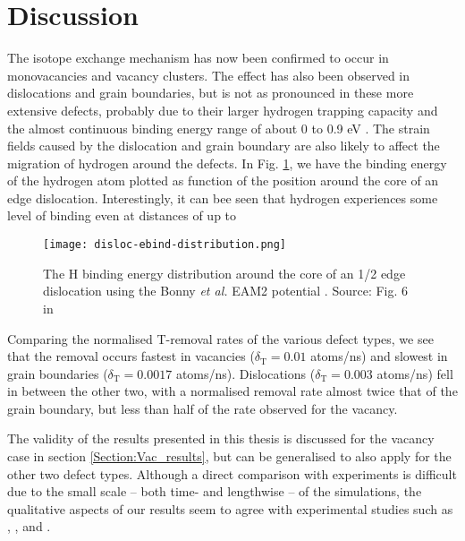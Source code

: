 \section{Discussion}
The isotope exchange mechanism has now been confirmed to occur in monovacancies and vacancy clusters. 
The effect has also been observed in dislocations and grain boundaries, but is not as pronounced in these more extensive defects, probably due to their larger hydrogen trapping capacity and the almost continuous binding energy range of about 0 to 0.9 eV \cite{grigorev2015interaction}. 
The strain fields caused by the dislocation and grain boundary are also likely to affect the migration of hydrogen around the defects.
In Fig. \ref{Fig:Disloc_ebind_dist}, we have the binding energy of the hydrogen atom plotted as function of the position around the core of an edge dislocation. 
Interestingly, it can bee seen that hydrogen experiences some level of binding even at distances of up to 


\begin{figure}[!ht]
	\center
	\texttt{[image: disloc-ebind-distribution.png]}
	\caption{The H binding energy distribution around the core of an 1/2\hkl[1 1 1] edge dislocation using the Bonny \textit{et al.} EAM2 potential \cite{bonny2014many}. Source: Fig. 6 in \cite{grigorev2015interaction}}
	\label{Fig:Disloc_ebind_dist}
\end{figure}

Comparing the normalised T-removal rates of the various defect types, we see that the removal occurs fastest in vacancies ($\delta_{\text{T}} = 0.01$ atoms/ns) and slowest in grain boundaries ($\delta_{\text{T}} = 0.0017$ atoms/ns). 
Dislocations ($\delta_{\text{T}} = 0.003$ atoms/ns) fell in between the other two, with a normalised removal rate almost twice that of the grain boundary, but less than half of the rate observed for the vacancy.

The validity of the results presented in this thesis is discussed for the vacancy case in section \ref{Section:Vac_results}, but can be generalised to also apply for the other two defect types. 
Although a direct comparison with experiments is difficult due to the small scale -- both time- and lengthwise -- of the simulations, the qualitative aspects of our results seem to agree with experimental studies such as \cite{alimov2011hydrogen}, \cite{roth2013hydrogen}, \cite{barton2014deuterium} and \cite{ahlgren2019hydrogen}. 
